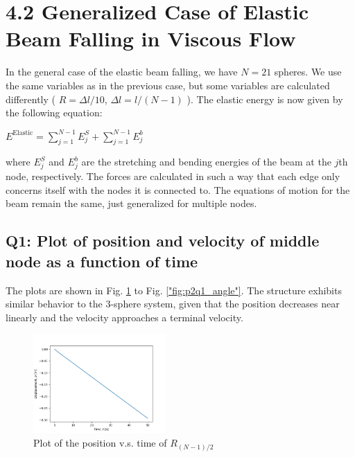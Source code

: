 \documentclass[letterpaper, 10 pt, conference]{ieeeconf}  %
\begin{document}
\section{4.2 Generalized Case of Elastic Beam Falling in Viscous Flow}

In the general case of the elastic beam falling, we have $N = 21$ spheres. We use the same variables as in the previous case, but some variables are calculated differently ( $R = \Delta l / 10$, $\Delta l = l / (N - 1)$ ). The elastic energy is now given by the following equation:

\begin{center}
        $E^{\text{Elastic}} = \sum\limits_{j=1}^{N-1} E^S_j + \sum\limits_{j=1}^{N-1} E^b_j $
\end{center}

where $E^S_j$ and $E^b_j$ are the stretching and bending energies of the beam at the $j$th node, respectively. The forces are calculated in such a way that each edge only concerns itself with the nodes it is connected to. The equations of motion for the beam remain the same, just generalized for multiple nodes.

\subsection*{Q1: Plot of position and velocity of middle node as a function of time}

The plots are shown in Fig. \ref{"fig:p2q1_position"} to Fig. \ref{"fig:p2q1_angle"}. The structure exhibits similar behavior to the 3-sphere system, given that the position decreases near linearly and the velocity approaches a terminal velocity.

\begin{figure}[!ht]
        \centering
        \includegraphics[width=0.45\textwidth,keepaspectratio]{p2q1_implicit_fallingBeam.png}
        \caption{Plot of the position v.s. time of $R_{(N-1)/2}$}
        \label{"fig:p2q1_position"}
\end{figure}
\end{document}

